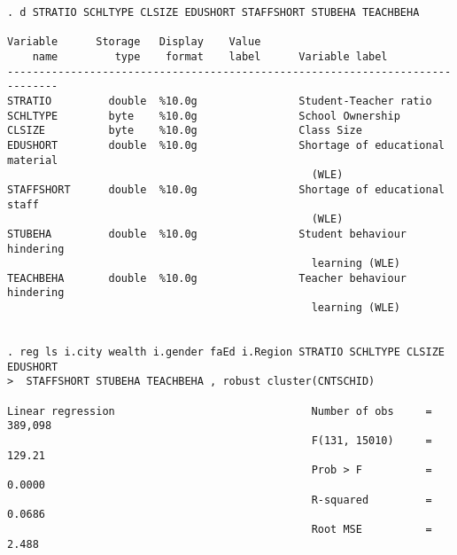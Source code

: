 \documentclass[11pt, letterpaper]{article}
\begin{document}
\begin{spacing}{1.9}
\begin{spacing}{.5}
\begin{scriptsize}
\begin{verbatim}
. d STRATIO SCHLTYPE CLSIZE EDUSHORT STAFFSHORT STUBEHA TEACHBEHA 

Variable      Storage   Display    Value
    name         type    format    label      Variable label
------------------------------------------------------------------------------
STRATIO         double  %10.0g                Student-Teacher ratio
SCHLTYPE        byte    %10.0g                School Ownership
CLSIZE          byte    %10.0g                Class Size
EDUSHORT        double  %10.0g                Shortage of educational material
                                                (WLE)
STAFFSHORT      double  %10.0g                Shortage of educational staff
                                                (WLE)
STUBEHA         double  %10.0g                Student behaviour hindering
                                                learning (WLE)
TEACHBEHA       double  %10.0g                Teacher behaviour hindering
                                                learning (WLE)


. reg ls i.city wealth i.gender faEd i.Region STRATIO SCHLTYPE CLSIZE EDUSHORT
>  STAFFSHORT STUBEHA TEACHBEHA , robust cluster(CNTSCHID)

Linear regression                               Number of obs     =    389,098
                                                F(131, 15010)     =     129.21
                                                Prob > F          =     0.0000
                                                R-squared         =     0.0686
                                                Root MSE          =      2.488


\end{verbatim}
\end{scriptsize}
\end{spacing}
\end{spacing}
\end{document}
